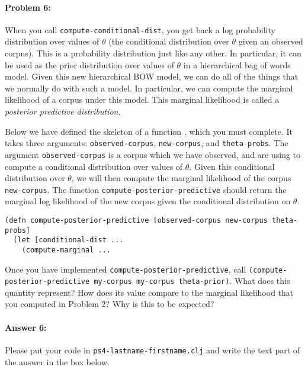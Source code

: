 \documentclass[10pt]{article}
\newcommand{\required}[1]{{\color{blue}{#1}}}
\newcommand{\PSnum}{4}
\begin{document}
\paragraph{Problem 6:}
When you call \texttt{compute-conditional-dist}, you get back a log
probability distribution over values of $\theta$ (the conditional
distribution over $\theta$ given an observed corpus). This is a
probability distribution just like any other. In particular, it can be
used as the prior distribution over values of $\theta$ in a
hierarchical bag of words model. Given this new hierarchical BOW
model, we can do all of the things that we normally do with such a
model. In particular, we can compute the marginal likelihood of a
corpus under this model. This marginal likelihood is called a
\emph{posterior predictive distribution}.

 Below we have defined the skeleton of a function
\required{\texttt{compute-posterior-predictive}}, which you must
complete. It takes three arguments: \texttt{observed-corpus},
\texttt{new-corpus}, and \texttt{theta-probs}. The argument
\texttt{observed-corpus} is a corpus which we have observed, and are
using to compute a conditional distribution over values of $\theta$.
Given this conditional distribution over $\theta$, we will then
compute the marginal likelihood of the corpus \texttt{new-corpus}. The
function \texttt{compute-posterior-predictive} should return the
marginal log likelihood of the new corpus given the conditional
distribution on $\theta$.

\begin{lstlisting}
(defn compute-posterior-predictive [observed-corpus new-corpus theta-probs]
  (let [conditional-dist ...
    (compute-marginal ...
\end{lstlisting}

 Once you have implemented
\texttt{compute-posterior-predictive}, call
\texttt{(compute-posterior-predictive my-corpus my-corpus
theta-prior)}. What does this quantity represent? How does its value
compare to the marginal likelihood that you computed in Problem 2? Why
is this to be expected?

\paragraph{Answer 6:} Please put your code in
\texttt{ps\PSnum-lastname-firstname.clj} and write the text part of
the answer in the box below.
\end{document}
